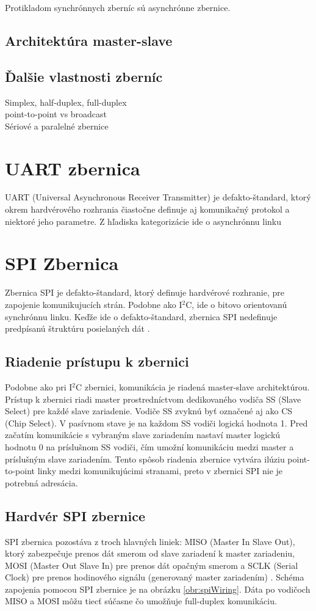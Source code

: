 Protikladom synchrónnych zberníc sú asynchrónne zbernice.

\subsection{Architektúra master-slave}

\subsection{Ďalšie vlastnosti zberníc}
Simplex, half-duplex, full-duplex\\
point-to-point vs broadcast\\
Sériové a paralelné zbernice

\section{UART zbernica}
UART (Universal Asynchronous Receiver Transmitter) je defakto-štandard, ktorý okrem hardvérového rozhrania čiastočne definuje aj komunikačný protokol a niektoré jeho parametre. Z hľadiska kategorizácie ide o asynchrónnu linku

\section{SPI Zbernica}
Zbernica SPI je defakto-štandard, ktorý definuje hardvérové rozhranie, pre zapojenie komunikujucích strán. Podobne ako I$^2$C, ide o bitovo orientovanú synchrónnu linku. Keďže ide o defakto-štandard, zbernica SPI nedefinuje predpísanú štruktúru posielaných dát \cite{spiBus}.

\subsection{Riadenie prístupu k zbernici}
Podobne ako pri I$^2$C zbernici, komunikácia je riadená master-slave architektúrou. Prístup k zbernici riadi master prostredníctvom dedikovaného vodiča SS (Slave Select) pre každé slave zariadenie. Vodiče SS zvyknú byť označené aj ako CS (Chip Select). V pasívnom stave je na každom SS vodiči logická hodnota 1. Pred začatím komunikácie s vybraným slave zariadením nastaví master logickú hodnotu 0 na príslušnom SS vodiči, čím umožní komunikáciu medzi master a príslušným slave zariadením. Tento spôsob riadenia zbernice vytvára ilúziu point-to-point linky medzi komunikujúcimi stranami, preto v zbernici SPI nie je potrebná adresácia.

\subsection{Hardvér SPI zbernice}
SPI zbernica pozostáva z troch hlavných liniek: MISO (Master In Slave Out), ktorý zabezpečuje prenos dát smerom od slave zariadení k master zariadeniu, MOSI (Master Out Slave In) pre prenos dát opačným smerom a SCLK (Serial Clock) pre prenos hodinového signálu (generovaný master zariadením) \cite{spiBus}. Schéma zapojenia pomocou SPI zbernice je na obrázku \ref{obr:spiWiring}. Dáta po vodičoch MISO a MOSI môžu tiecť súčasne čo umožňuje full-duplex komunikáciu.

